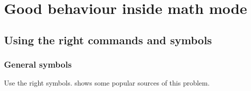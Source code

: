 \chapter{Good behaviour inside math mode}





\section{Using the right commands and symbols}



\subsection{General symbols}

Use the right symbols.
 shows some popular sources of this problem.
